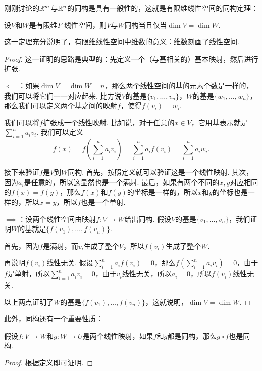 刚刚讨论的$\mathbb{R}^m$与$\mathbb{R}^n$的同构是具有一般性的，这就是有限维线性空间的同构定理：

\begin{theorem}[有限维线性空间的同构定理]\label{thm:finite-dim-linear-space-isomorphism}
设$V$和$W$是有限维$F$-线性空间，则$V$与$W$同构当且仅当$\dim V=\dim W$. 
\end{theorem}
这一定理充分说明了，有限维线性空间中维数的意义：维数刻画了线性空间. 
\begin{proof}
    这一证明的思路是典型的：先定义一个（与基相关的）基本映射，然后进行扩张. 
    
    $\impliedby$：如果$\dim V=\dim W=n$，那么两个线性空间的基的元素个数是一样的，我们可以将它们一一对应起来. 比方说$V$的基是$\{v_1,\dots,v_n\}$，$W$的基是$\{w_1,\dots,w_n\}$，那么我们可以定义两个基之间的映射$f$，使得$f(v_i)=w_i$. 
    
    我们可以将$f$扩张成一个线性映射. 比如说，对于任意的$x\in V$，它用基表示就是$\sum_{i=1}^n a_iv_i$. 我们可以定义
    \[f(x)=f\left(\sum_{i=1}^n a_iv_i\right)=\sum_{i=1}^n a_if(v_i)=\sum_{i=1}^n a_iw_i.\]

    接下来验证$f$是$V$到$W$同构. 首先，按照定义就可以验证这是一个线性映射. 其次，因为$a_i$是任意的，所以这显然也是一个满射. 最后，如果有两个不同的$x,y$对应相同的$f(x)=f(y)$，那么$f(x)$和$f(y)$的坐标是一样的，所以$x$和$y$的坐标也是一样的，所以$x=y$，所以$f$也是一个单射. 

    $\implies$：设两个线性空间由映射$f:V\to W$给出同构. 假设$V$的基是$\{v_1,\dots,v_n\}$，我们证明$W$的基就是$\{f(v_1),\dots,f(v_n)\}$. 
    
    首先，因为$f$是满射，而$v_i$生成了整个$V$，所以$f(v_i)$生成了整个$W$. 
    
    再说明$f(v_i)$线性无关. 假设$\sum_{i=1}^n a_if(v_i)=0$，那么$f(\sum_{i=1}^n a_iv_i)=0$，由于$f$是单射，所以$\sum_{i=1}^n a_iv_i=0$，由于$v_i$线性无关，所以$a_i=0$，所以$f(v_i)$线性无关. 
    
    以上两点证明了$W$的基是$\{f(v_1),\dots,f(v_n)\}$，这就说明，$\dim V=\dim W$. 
\end{proof}

此外，同构还有一个重要性质：
\begin{proposition}\label{prop:isomorphism-composition}
假设$f:V\to W$和$g:W\to U$是两个线性映射，如果$f$和$g$都是同构，那么$g\circ f$也是同构. 
\end{proposition}
\begin{proof}
    根据定义即可证明.     
\end{proof}



